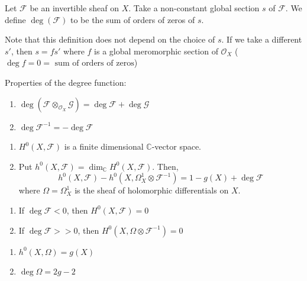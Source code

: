 \documentclass[oneside, 12pt, ]{scrbook}
\newcommand{\CC}{\mathbb C}
\theoremstyle{theorem}
\begin{document}
\begin{definition}
Let $\mathcal{F}$ be an invertible sheaf on $X$. Take a non-constant global section $s$ of $\mathcal{F}$. We define $\deg(\mathcal{F})$ to be the sum of orders of zeros of $s$. 
\end{definition}

\begin{remark}
Note that this definition does not depend on the choice of $s$. If we take a different $s'$, then $s = fs'$ where $f$ is a global meromorphic section of $\mathcal{O}_{X}$ ($\deg f = 0 = \text{ sum of orders of zeros}$)
\end{remark}

\begin{proposition}
Properties of the degree function:
\begin{enumerate}
\item $\deg(\mathcal{F} \otimes_{\mathcal{O}_{X}} \mathcal{G}) = \deg \mathcal{F} + \deg \mathcal{G}$
\item $\deg \mathcal{F}^{-1} = - \deg \mathcal{F}$
\end{enumerate}
\end{proposition}

\begin{theorem}
\begin{enumerate}
\item $H^{0}(X, \mathcal{F})$ is a finite dimensional $\CC$-vector space.
\item Put $h^{0}(X,\mathcal{F}) = \dim_{\CC}H^{0} (X, \mathcal{F})$. Then, $$h^{0}(X, \mathcal{F}) - h^{0}(X, \Omega_{X}^{1} \otimes \mathcal{F}^{-1}) = 1- g(X) + \deg \mathcal{F}$$ where $\Omega = \Omega_{X}^{1}$ is the sheaf of holomorphic differentials on $X$.
\end{enumerate}
\end{theorem}

\begin{remark}[Facts]
\begin{enumerate}
\item If $\deg \mathcal{F} < 0$, then $H^{0}(X, \mathcal{F})=0$ 
\item If $\deg \mathcal{F} >>0$, then $H^{0}(X, \Omega \otimes \mathcal{F}^{-1})=0$
\end{enumerate}
\end{remark}

\begin{lemma}
\begin{enumerate}
\item $h^{0}(X, \Omega) = g(X)$
\item $\deg \Omega = 2g-2$
\end{enumerate}
\end{lemma}
\end{document}
